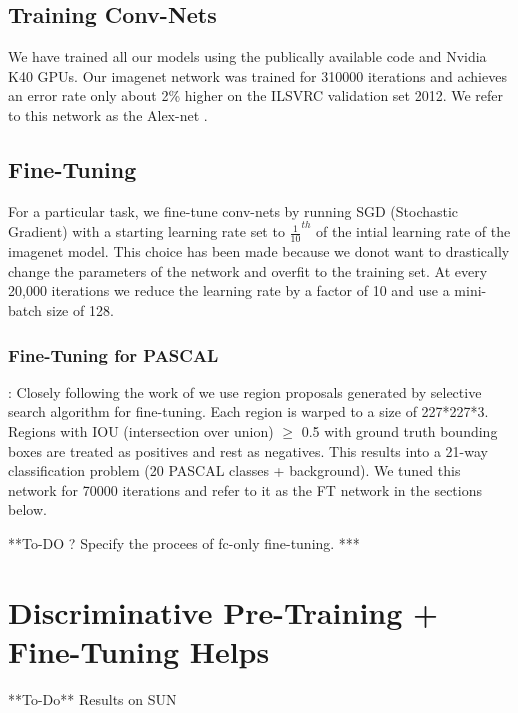 \documentclass[runningheads]{llncs}
\begin{document}
\subsection{Training Conv-Nets}
We have trained all our models using the publically available code \cite{caffe} and Nvidia K40 GPUs. Our imagenet network was trained for 310000 iterations and achieves an error rate only about 2\% higher on the ILSVRC validation set 2012. We refer to this network as the Alex-net .

\subsection{Fine-Tuning}
For a particular task, we fine-tune conv-nets by running SGD (Stochastic Gradient) with a starting learning rate set to $\frac{1}{10}^{th}$ of the intial learning rate of the imagenet model. This choice has been made because we donot want to drastically change the parameters of the network and overfit to the training set. At every 20,000 iterations we reduce the learning rate by a factor of 10 and use a mini-batch size of 128.

\subsubsection{Fine-Tuning for PASCAL}: Closely following the work of \cite{rcnn} we use region proposals generated by selective search algorithm for fine-tuning. Each region is warped to a size of 227*227*3. Regions with IOU (intersection over union) $\geq$ 0.5 with ground truth bounding boxes are treated as positives and rest as negatives. This  results into a 21-way classification problem (20 PASCAL classes + background). We tuned this network for 70000 iterations and refer to it as the FT network in the sections below.

**To-DO ? Specify the procees of fc-only fine-tuning.  ***

\section{Discriminative Pre-Training + Fine-Tuning Helps}
**To-Do** Results on SUN
\end{document}
